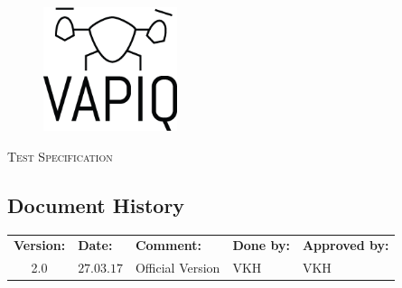 \documentclass{article}
\author{Aleksander Holthe  \\ Katrine Sundal Haune \\ Kent Kjeldaas \\ Stian Fredriksen \\ Tomas Lyngroth \\ Vanja Katinka Halvorsen}
\makeatletter
\let\vapiqteam\@author
\makeatother
\begin{document}
\begin{titlepage}
    \centering
    \pagecolor{gainsboro}
	\\[3.0 cm]
    \begin{figure}[h]
        \centering
        \includegraphics[width = 0.35\textwidth]{VAPIQ-PICTURES//Logo2_Tilted.png}
        \\[2.0 cm] 
    \end{figure}                              
    \textsc{\Huge Test Specification}  
    \\[4 cm]
	\large \vapiqteam      
\end{titlepage}
\pagecolor{white}


\begin{center}
\section*{\textbf{Document History}}
\begin{tabular}{cllll}
\rowcolor{cadetgrey}
\textbf{Version:}    &\textbf{Date:} 	 &\textbf{Comment:}    &\textbf{Done by:}   &\textbf{Approved by:}  \\
2.0    & $27.03.17$    & Official Version & VKH & VKH \\
\end{tabular}                                                                   
\end{center}
\vspace*{1 cm}
\end{document}
